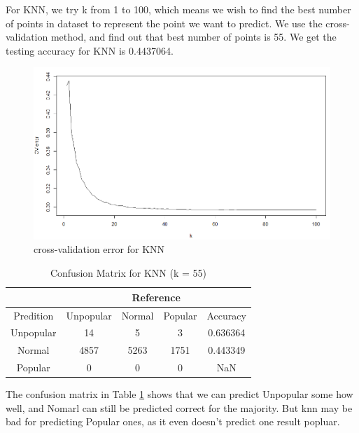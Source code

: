 \documentclass[11pt]{article}
\begin{document}
For KNN, we try k from 1 to 100, which means we wish to find the best number of points in dataset to represent the point we want to predict. We use the cross-validation method, and find out that best number of points is 55. We get the testing accuracy for KNN is 0.4437064.

    \begin{figure}[h]
        \centering
        \includegraphics[width=0.7\linewidth]{knn_cv.png}
        \caption{cross-validation error for KNN}
    \end{figure}

    \begin{table}[h]
        \centering
        \caption{Confusion Matrix for KNN (k = 55)}
        \begin{tabular}{ c | c | c | c | c }
            \hline\hline
            {} & \multicolumn{4}{c}{Reference} \\
            \hline
            Predition & Unpopular & Normal & Popular & Accuracy\\
            \hline
            Unpopular & 14 & 5 & 3 & 0.636364\\
            \hline
            Normal & 4857 & 5263 & 1751 & 0.443349\\
            \hline
            Popular & 0 & 0 & 0 & NaN\\
            \hline\hline
        \end{tabular}
        \label{table:knn}
    \end{table}

The confusion matrix in Table \ref{table:knn} shows that we can predict Unpopular some how well, and Nomarl can still be predicted correct for the majority. But knn may be bad for predicting Popular ones, as it even doesn't predict one result popluar.
\end{document}
